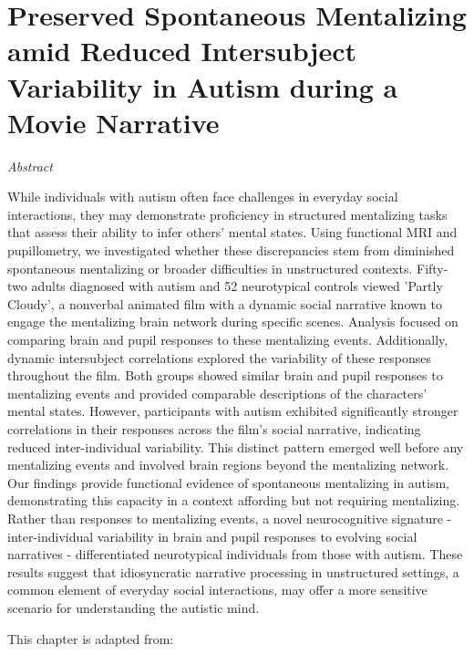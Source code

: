 \chapter{Preserved Spontaneous Mentalizing amid Reduced Intersubject Variability in Autism during a Movie Narrative}
\label{ch:mentalizing_asc}

\begin{center}
    \large\textit{Abstract}
\end{center} 

{\abstractfont 
While individuals with autism often face challenges in everyday social interactions, they may demonstrate proficiency in structured mentalizing tasks that assess their ability to infer others' mental states. Using functional MRI and pupillometry, we investigated whether these discrepancies stem from diminished spontaneous mentalizing or broader difficulties in unstructured contexts. Fifty-two adults diagnosed with autism and 52 neurotypical controls viewed 'Partly Cloudy', a nonverbal animated film with a dynamic social narrative known to engage the mentalizing brain network during specific scenes. Analysis focused on comparing brain and pupil responses to these mentalizing events. Additionally, dynamic intersubject correlations explored the variability of these responses throughout the film. Both groups showed similar brain and pupil responses to mentalizing events and provided comparable descriptions of the characters' mental states. However, participants with autism exhibited significantly stronger correlations in their responses across the film's social narrative, indicating reduced inter-individual variability. This distinct pattern emerged well before any mentalizing events and involved brain regions beyond the mentalizing network. Our findings provide functional evidence of spontaneous mentalizing in autism, demonstrating this capacity in a context affording but not requiring mentalizing. Rather than responses to mentalizing events, a novel neurocognitive signature - inter-individual variability in brain and pupil responses to evolving social narratives - differentiated neurotypical individuals from those with autism. These results suggest that idiosyncratic narrative processing in unstructured settings, a common element of everyday social interactions, may offer a more sensitive scenario for understanding the autistic mind. \par
} 

\vspace*{\fill} 
This chapter is adapted from: 

